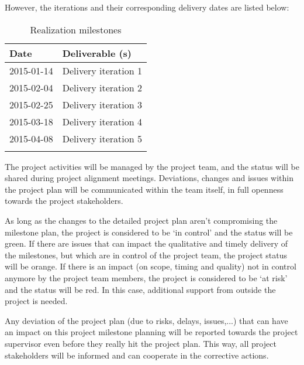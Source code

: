 However, the iterations and their corresponding delivery dates  are listed below:
%
\begin{longtable}{|l|l|}\hline
    \textbf{Date} & \textbf{Deliverable (s)} \\\hline
	\endhead
    2015-01-14 & Delivery iteration 1\\\hline
    2015-02-04 & Delivery iteration 2\\\hline
    2015-02-25 & Delivery iteration 3\\\hline
    2015-03-18 & Delivery iteration 4\\\hline
    2015-04-08 & Delivery iteration 5\\\hline
  \caption{Realization milestones}
  \label{tab:realization-milestones}
\end{longtable}

\noindent
The project activities will be managed by the project team, and the status will be shared during project alignment meetings.
Deviations, changes and issues within the project plan will be communicated within the team itself, in full openness towards the project stakeholders.

As long as the changes to the detailed project plan aren't  compromising the milestone plan, the project is considered to be `in control' and the status will be green.
If there are issues that can impact the qualitative and timely delivery of the milestones, but which are in control of the project team, the project status will be orange.
If there is an impact (on scope, timing and quality) not in control anymore by the project team members, the project is considered to be `at risk' and the status will be red.
In this case, additional support from outside the project is needed.

Any deviation of the project plan (due to risks, delays, issues,...) that can have an impact on this project milestone planning will be reported towards the project supervisor even before they really hit the project plan.
This way, all project stakeholders will be informed and can cooperate in the corrective actions.
